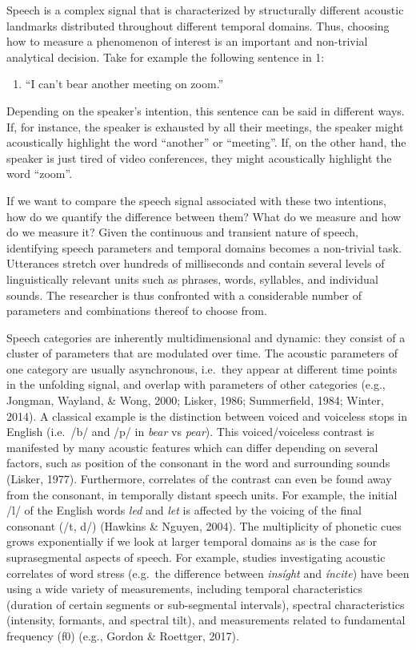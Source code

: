 \documentclass[
  english,
  man,floatsintext]{apa6}
\providecommand{\tightlist}{%
  \setlength{\itemsep}{0pt}\setlength{\parskip}{0pt}}
\begin{document}
Speech is a complex signal that is characterized by structurally different acoustic landmarks distributed throughout different temporal domains.
Thus, choosing how to measure a phenomenon of interest is an important and non-trivial analytical decision. Take for example the following sentence in 1:

\begin{enumerate}
\def\labelenumi{(\arabic{enumi})}
\tightlist
\item
  \enquote{I can't bear another meeting on zoom.}
\end{enumerate}

Depending on the speaker's intention, this sentence can be said in different ways.
If, for instance, the speaker is exhausted by all their meetings, the speaker might acoustically highlight the word \enquote{another} or \enquote{meeting}.
If, on the other hand, the speaker is just tired of video conferences, they might acoustically highlight the word \enquote{zoom}.

If we want to compare the speech signal associated with these two intentions, how do we quantify the difference between them? What do we measure and how do we measure it?
Given the continuous and transient nature of speech, identifying speech parameters and temporal domains becomes a non-trivial task.
Utterances stretch over hundreds of milliseconds and contain several levels of linguistically relevant units such as phrases, words, syllables, and individual sounds.
The researcher is thus confronted with a considerable number of parameters and combinations thereof to choose from.

Speech categories are inherently multidimensional and dynamic: they consist of a cluster of parameters that are modulated over time.
The acoustic parameters of one category are usually asynchronous, i.e.~they appear at different time points in the unfolding signal, and overlap with parameters of other categories (e.g., Jongman, Wayland, \& Wong, 2000; Lisker, 1986; Summerfield, 1984; Winter, 2014).
A classical example is the distinction between voiced and voiceless stops in English (i.e.~/b/ and /p/ in \emph{bear} vs \emph{pear}).
This voiced/voiceless contrast is manifested by many acoustic features which can differ depending on several factors, such as position of the consonant in the word and surrounding sounds (Lisker, 1977).
Furthermore, correlates of the contrast can even be found away from the consonant, in temporally distant speech units.
For example, the initial /l/ of the English words \emph{led} and \emph{let} is affected by the voicing of the final consonant (/t, d/) (Hawkins \& Nguyen, 2004).
The multiplicity of phonetic cues grows exponentially if we look at larger temporal domains as is the case for suprasegmental aspects of speech.
For example, studies investigating acoustic correlates of word stress (e.g.~the difference between \emph{insíght} and \emph{íncite}) have been using a wide variety of measurements, including temporal characteristics (duration of certain segments or sub-segmental intervals), spectral characteristics (intensity, formants, and spectral tilt), and measurements related to fundamental frequency (f0) (e.g., Gordon \& Roettger, 2017).
\end{document}
